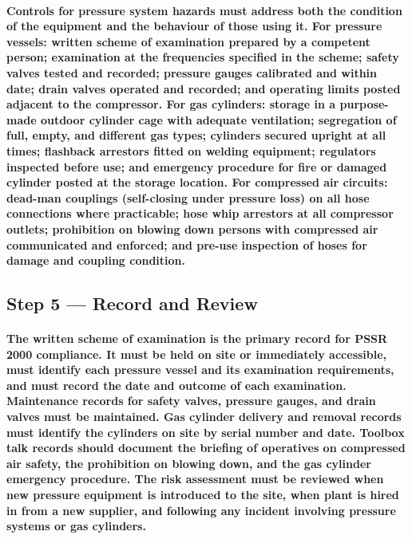 \paragraph{Controls for pressure system hazards must address both the condition of the equipment and the behaviour of those using it. For pressure vessels: written scheme of examination prepared by a competent person; examination at the frequencies specified in the scheme; safety valves tested and recorded; pressure gauges calibrated and within date; drain valves operated and recorded; and operating limits posted adjacent to the compressor. For gas cylinders: storage in a purpose-made outdoor cylinder cage with adequate ventilation; segregation of full, empty, and different gas types; cylinders secured upright at all times; flashback arrestors fitted on welding equipment; regulators inspected before use; and emergency procedure for fire or damaged cylinder posted at the storage location. For compressed air circuits: dead-man couplings (self-closing under pressure loss) on all hose connections where practicable; hose whip arrestors at all compressor outlets; prohibition on blowing down persons with compressed air communicated and enforced; and pre-use inspection of hoses for damage and coupling condition.}

\subsection{Step 5 --- Record and Review}
\paragraph{The written scheme of examination is the primary record for PSSR 2000 compliance. It must be held on site or immediately accessible, must identify each pressure vessel and its examination requirements, and must record the date and outcome of each examination. Maintenance records for safety valves, pressure gauges, and drain valves must be maintained. Gas cylinder delivery and removal records must identify the cylinders on site by serial number and date. Toolbox talk records should document the briefing of operatives on compressed air safety, the prohibition on blowing down, and the gas cylinder emergency procedure. The risk assessment must be reviewed when new pressure equipment is introduced to the site, when plant is hired in from a new supplier, and following any incident involving pressure systems or gas cylinders.}

